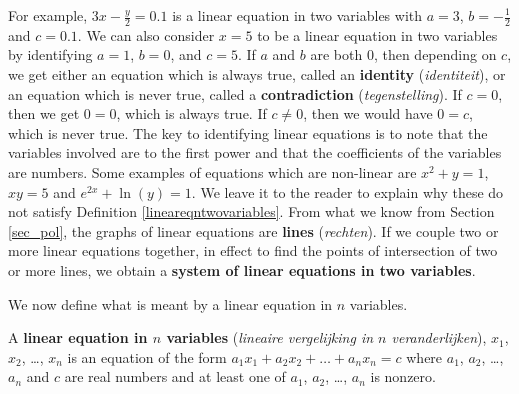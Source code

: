 For example, $3x - \frac{y}{2} = 0.1$ is a linear equation in two variables with $a = 3$, $b = -\frac{1}{2}$ and $c = 0.1$.  We can also consider $x = 5$ to be a linear equation in two variables by identifying $a = 1$, $b = 0$, and $c = 5$.  If $a$ and $b$ are both $0$, then depending on $c$, we get either an equation which is always true, called an \textbf{identity} (\textit{identiteit}), or an equation which is never true, called a \textbf{contradiction} (\textit{tegenstelling}). If $c = 0$, then we get $0 = 0$, which is always true.  If $c \neq 0$, then we would have  $0 = c$, which is never true. The key to identifying linear equations is to note that the variables involved are to the first power and that the coefficients of the variables are numbers.  Some examples of equations which are non-linear are $x^2 + y = 1$, $xy = 5$ and $e^{2x} + \ln(y) = 1$.  We leave it to the reader to explain why these do not satisfy Definition \ref{lineareqntwovariables}.  From what we know from Section \ref{sec_pol}, the graphs of linear equations are \textbf{lines} (\textit{rechten}).  If we couple two or more linear equations together, in effect to find the points of intersection of two or more lines, we obtain a \textbf{system of linear equations in two variables}.  

\smallskip

We now define what is meant by a linear equation in $n$ variables.

\smallskip

\begin{definition}
\label{lineareqnnvariables}  
A  \textbf{linear equation in $n$ variables} (\textit{lineaire vergelijking in $n$ veranderlijken}), $x_1$, $x_2$, \ldots, $x_{n}$ is an equation of the form $a_1 x_1 + a_2 x_2 + \ldots + a_{n} x_{n} = c$ where $a_1$, $a_2$, \dots, $a_{n}$  and $c$ are real numbers and at least one of $a_1$, $a_2$, \dots, $a_{n}$ is nonzero.
	
\end{definition}

\smallskip

